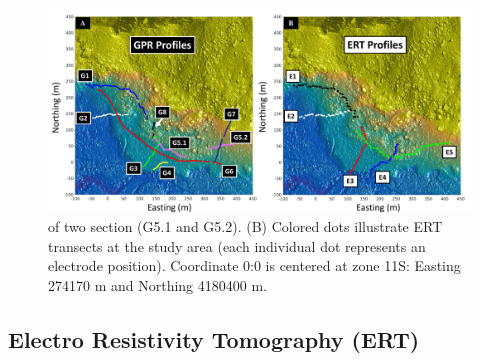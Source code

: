 \documentclass[5p]{elsarticle}
\newcommand{\COMON}{\begin{color}{blue}}
\newcommand{\COMOFF}{\end{color}}
\begin{document}


											\begin{figure}[h]

	\includegraphics[width=\textwidth]{Figures/GPR_ERT_Map.pdf}
		\caption{of two section (G5.1 and G5.2). (B) Colored dots illustrate ERT transects at the study area (each individual dot represents an electrode position). Coordinate 0:0 is centered at zone 11S: Easting 274170 m and Northing 4180400 m.  \label{GPR profile 7}}

											\end{figure}										
											
												
												
		\subsection{Electro Resistivity Tomography (ERT)}

                
\end{document}

